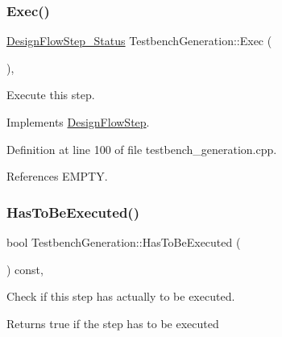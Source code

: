 \mbox{\label{classTestbenchGeneration_a85c026e1008605a36960dbbd4f80a14e}} 
\subsubsection{\texorpdfstring{Exec()}{Exec()}}
{\footnotesize\ttfamily \hyperlink{design__flow__step_8hpp_afb1f0d73069c26076b8d31dbc8ebecdf}{Design\+Flow\+Step\+\_\+\+Status} Testbench\+Generation\+::\+Exec (\begin{DoxyParamCaption}{ }\end{DoxyParamCaption})\hspace{0.3cm}{\ttfamily [override]}, {\ttfamily [virtual]}}



Execute this step. 



Implements \hyperlink{classDesignFlowStep_a77d7e38493016766098711ea24f60b89}{Design\+Flow\+Step}.



Definition at line 100 of file testbench\+\_\+generation.\+cpp.



References E\+M\+P\+TY.

\mbox{\label{classTestbenchGeneration_acf3bc257f411c14241561002b00a72c1}} 
\subsubsection{\texorpdfstring{Has\+To\+Be\+Executed()}{HasToBeExecuted()}}
{\footnotesize\ttfamily bool Testbench\+Generation\+::\+Has\+To\+Be\+Executed (\begin{DoxyParamCaption}{ }\end{DoxyParamCaption}) const\hspace{0.3cm}{\ttfamily [override]}, {\ttfamily [virtual]}}



Check if this step has actually to be executed. 

\begin{DoxyReturn}{Returns}
true if the step has to be executed 
\end{DoxyReturn}


